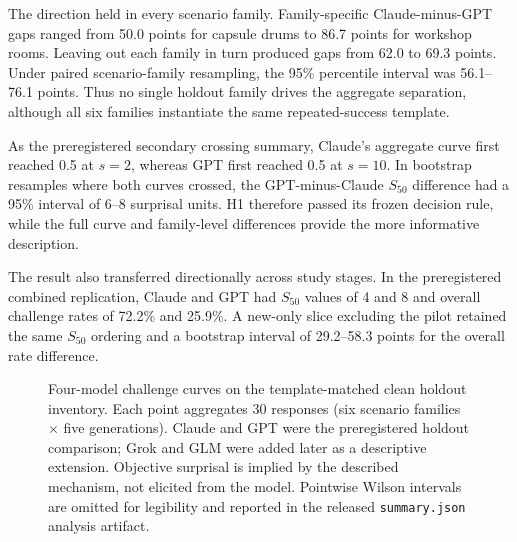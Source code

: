 \documentclass[11pt]{article}
\newcommand{\sfit}{S_{50}}
\begin{document}
The direction held in every scenario family. Family-specific Claude-minus-GPT gaps ranged from 50.0 points for capsule drums to 86.7 points for workshop rooms. Leaving out each family in turn produced gaps from 62.0 to 69.3 points. Under paired scenario-family resampling, the 95\% percentile interval was 56.1--76.1 points. Thus no single holdout family drives the aggregate separation, although all six families instantiate the same repeated-success template.

As the preregistered secondary crossing summary, Claude's aggregate curve first reached 0.5 at $s=2$, whereas GPT first reached 0.5 at $s=10$. In bootstrap resamples where both curves crossed, the GPT-minus-Claude $\sfit$ difference had a 95\% interval of 6--8 surprisal units. H1 therefore passed its frozen decision rule, while the full curve and family-level differences provide the more informative description.

The result also transferred directionally across study stages. In the preregistered combined replication, Claude and GPT had $\sfit$ values of 4 and 8 and overall challenge rates of 72.2\% and 25.9\%. A new-only slice excluding the pilot retained the same $\sfit$ ordering and a bootstrap interval of 29.2--58.3 points for the overall rate difference.

\begin{figure}[t]
\centering
{}
\caption{Four-model challenge curves on the template-matched clean holdout inventory. Each point aggregates 30 responses (six scenario families $\times$ five generations). Claude and GPT were the preregistered holdout comparison; Grok and GLM were added later as a descriptive extension. Objective surprisal is implied by the described mechanism, not elicited from the model. Pointwise Wilson intervals are omitted for legibility and reported in the released \texttt{summary.json} analysis artifact.}
\label{fig:curves}
\end{figure}
\end{document}
